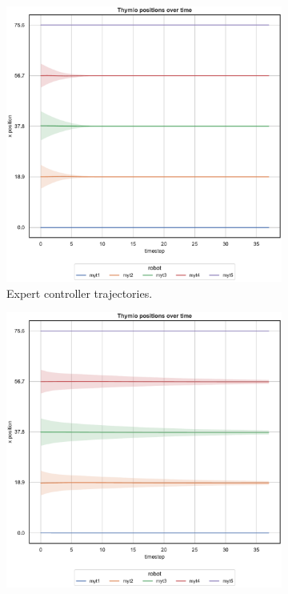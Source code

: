 \begin{figure}[!htb]
	\begin{center}
		\begin{subfigure}[h]{0.49\textwidth}
			\centering
			\includegraphics[width=.9\textwidth]{contents/images/net-d1/position-overtime-omniscient}%
			\caption{Expert controller trajectories.}
		\end{subfigure}
		\hfill
		\begin{subfigure}[h]{0.49\textwidth}
			\centering
			\includegraphics[width=.9\textwidth]{contents/images/net-d1/position-overtime-learned_distributed}

\end{subfigure}
\end{center}
\end{figure}
